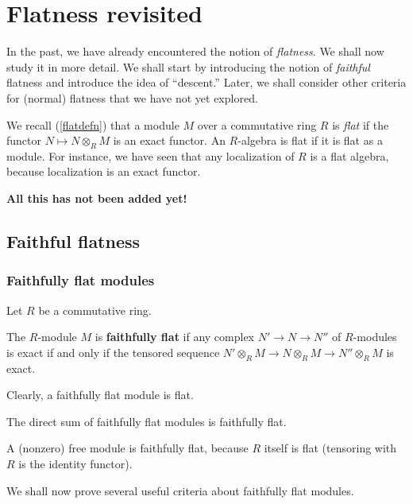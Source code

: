 \chapter{Flatness revisited}

In the past, we have already encountered the notion of \emph{flatness}. We
shall now study it in more detail.
We shall start by introducing the notion of \emph{faithful} flatness and
introduce the idea of ``descent.'' Later, we shall consider other criteria for
(normal) flatness that we have not yet explored.

We recall (\cref{flatdefn}) that a module $M$ over a commutative ring $R$ is
\emph{flat} if the functor $N \mapsto N \otimes_R M$ is an exact functor. An
$R$-algebra is flat if it is flat as a module. For instance, we have seen that
any localization of $R$ is a flat algebra, because localization is an exact
functor.

\textbf{All this has not been added yet!}

\section{Faithful flatness}



\subsection{Faithfully flat modules}
Let $R$ be a commutative ring.

\begin{definition} 
The $R$-module $M$ is \textbf{faithfully flat} if  any complex $N' \to N
\to N''$ of $R$-modules is exact if and only if the tensored sequence $N'
\otimes_R M \to N \otimes_R M \to N'' \otimes_R M$ is exact.
\end{definition} 

Clearly, a faithfully flat module is flat.


\begin{example} 
The direct sum of faithfully flat modules is faithfully flat.
\end{example} 
\begin{example} 
A (nonzero)  free module is faithfully flat, because $R$ itself is flat
(tensoring with $R$ is the identity functor).
\end{example} 

We shall now prove several useful criteria about faithfully flat modules.

